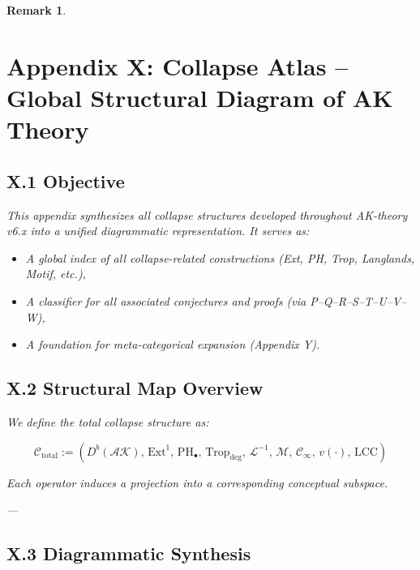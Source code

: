 \documentclass[11pt]{article}
\newtheorem{remark}[theorem]{Remark}
\begin{document}
\begin{remark}

\section*{Appendix X: Collapse Atlas – Global Structural Diagram of AK Theory}

\subsection*{X.1 Objective}

This appendix synthesizes all collapse structures developed throughout AK-theory v6.x  
into a unified diagrammatic representation. It serves as:

\begin{itemize}
  \item A global index of all collapse-related constructions (Ext, PH, Trop, Langlands, Motif, etc.),
  \item A classifier for all associated conjectures and proofs (via P–Q–R–S–T–U–V–W),
  \item A foundation for meta-categorical expansion (Appendix Y).
\end{itemize}

\subsection*{X.2 Structural Map Overview}

We define the total collapse structure as:

\[
\mathcal{C}_{\mathrm{total}} :=
\left(
  D^b(\mathcal{AK}), \,
  \mathrm{Ext}^1, \,
  \mathrm{PH}_\bullet, \,
  \mathrm{Trop}_{\mathrm{deg}}, \,
  \mathcal{L}^{-1}, \,
  \mathcal{M}, \,
  \mathscr{C}_\infty, \,
  v(\cdot), \,
  \mathrm{LCC}
\right)
\]

Each operator induces a projection into a corresponding conceptual subspace.

---

\subsection*{X.3 Diagrammatic Synthesis}


\end{remark}
\end{document}
